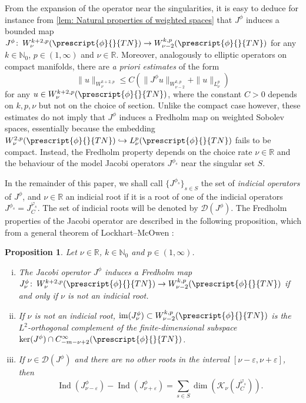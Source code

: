 \documentclass{article}
\numberwithin{equation}{section}        %
\theoremstyle{bfnote}
\newtheorem{prop}[thm]{Proposition}         %
\theoremstyle{definition}
\theoremstyle{bfremark}
\newcommand{\col}{\colon \thinspace}        %
\newcommand{\N}{\mathbb{N}}                 %
\newcommand{\R}{\mathbb{R}}                 %
\DeclareMathOperator{\im}{im}                   %
\DeclareMathOperator{\Ind}{Ind}                 %
\begin{document}
From the expansion of the operator near the singularities, it is easy to deduce for instance from \cref{lem: Natural properties of weighted spaces} that $J^\phi$ induces a bounded map $J^\phi \col W^{k+2,p}_\nu(\prescript{\phi}{}{TN}) \to W^{k,p}_{\nu-2}(\prescript{\phi}{}{TN})$ for any $k \in \N_0$, $p \in (1,\infty)$ and $\nu \in \R$. Moreover, analogously to elliptic operators on compact manifolds, there are \emph{a priori estimates} of the form
\begin{equation}
    \|u\|_{W^{k+2,p}_\nu} \leq C (\|J^\phi u\|_{W^{k,p}_{\nu-2}} + \|u\|_{L^p_\nu}) 
\end{equation}
for any $u \in W^{k+2,p}_\nu(\prescript{\phi}{}{TN})$, where the constant $C > 0$ depends on $k,p,\nu$ but not on the choice of section. Unlike the compact case however, these estimates do not imply that $J^\phi$ induces a Fredholm map on weighted Sobolev spaces, essentially because the embedding $W^{2,p}_\nu(\prescript{\phi}{}{TN}) \hookrightarrow L^p_\nu(\prescript{\phi}{}{TN})$ fails to be compact. Instead, the Fredholm property depends on the choice rate $\nu \in \R$ and the behaviour of the model Jacobi operators $J^{\phi_s}$ near the singular set $S$.

In the remainder of this paper, we shall call $\{J^{\phi_s}\}_{s \in S}$ the set of \emph{indicial operators} of $J^\phi$, and $\nu \in \R$ an indicial root if it is a root of one of the indicial operators $J^{\phi_s} = J^{\varphi_s}_C$. The set of indicial roots will be denoted by $\mathcal{D}(J^{\phi})$. The Fredholm properties of the Jacobi operator are described in the following proposition, which from a general theorem of Lockhart--McOwen \cite{Lockhart1985ellipticOperators_on_noncompact_mfds}:

\begin{prop}\label{prop: mapping properties Jacobi operator}
    Let $\nu \in \R$, $k \in \N_0$ and $p \in (1,\infty)$. 
    \begin{enumerate}[(i)]
        \item The Jacobi operator $J^\phi$ induces a Fredholm map $J^\phi_\nu \col W^{k+2,p}_\nu(\prescript{\phi}{}{TN}) \rightarrow W^{k,p}_{\nu-2}(\prescript{\phi}{}{TN})$ if and only if $\nu$ is not an indicial root.

        \item If $\nu$ is not an indicial root, $\im(J^\phi_\nu) \subset W^{k,p}_{\nu-2}(\prescript{\phi}{}{TN})$ is the $L^2$-orthogonal complement of the finite-dimensional subspace $\ker(J^\phi) \cap C^{\infty}_{-m-\nu+2}(\prescript{\phi}{}{TN})$.

        \item If $\nu \in \mathcal{D}(J^\phi)$ and there are no other roots in the interval $[\nu-\varepsilon,\nu+\varepsilon]$, then
        \begin{equation*}
            \Ind(J^\phi_{\nu-\varepsilon})-\Ind(J^\phi_{\nu+\varepsilon}) = \sum_{s \in S} \dim(\mathcal{K}_\nu(J^{\varphi_s}_C)).
        \end{equation*}
    \end{enumerate}
\end{prop}
\end{document}
